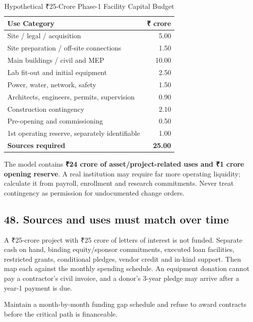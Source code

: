 \begin{table}[t]
\centering
\small
\caption{Hypothetical \textnormal{₹}25-Crore Phase-1 Facility Capital Budget}
\label{tab:ch34_facility_budget}
\begin{tabularx}{\columnwidth}{X r}
\toprule
\textbf{Use Category} & \textbf{\textnormal{₹} crore} \\
\midrule
Site / legal / acquisition & 5.00 \\
Site preparation / off-site connections & 1.50 \\
Main buildings / civil and MEP & 10.00 \\
Lab fit-out and initial equipment & 2.50 \\
Power, water, network, safety & 1.50 \\
Architects, engineers, permits, supervision & 0.90 \\
Construction contingency & 2.10 \\
Pre-opening and commissioning & 0.50 \\
1st operating reserve, separately identifiable & 1.00 \\
\midrule
\textbf{Sources required} & \textbf{25.00} \\
\bottomrule
\end{tabularx}
\end{table}
The model contains \textbf{\textnormal{₹}24 crore of asset/project-related uses and \textnormal{₹}1 crore opening reserve}. A real institution may require far more operating liquidity; calculate it from payroll, enrollment and research commitments. Never treat contingency as permission for undocumented change orders.


\subsection{48. Sources and uses must match over time}

A \textnormal{₹}25-crore project with \textnormal{₹}25 crore of letters of interest is not funded. Separate cash on hand, binding equity/sponsor commitments, executed loan facilities, restricted grants, conditional pledges, vendor credit and in-kind support. Then map each against the monthly spending schedule. An equipment donation cannot pay a contractor's civil invoice, and a donor's 3-year pledge may arrive after a year-1 payment is due.

Maintain a month-by-month funding gap schedule and refuse to award contracts before the critical path is financeable.


